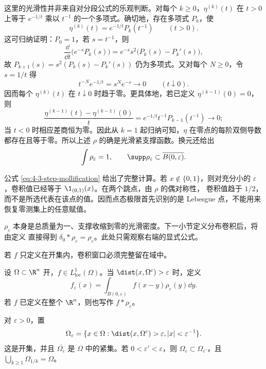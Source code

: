 这里的光滑性并非来自对分段公式的乐观判断。对每个 $k\geq0$，$\eta^{(k)}(t)$ 在 $t>0$
上等于 $e^{-1/t}$ 乘以 $t^{-1}$ 的一个多项式。确切地，存在多项式 $P_k$，使
\[
 \eta^{(k)}(t)=e^{-1/t}P_k(t^{-1})\qquad(t>0).
\]
这可归纳证明：$P_0=1$，若 $s=t^{-1}$，则
\[
 \frac{\dd}{\dd t}\bigl(e^{-s}P_k(s)\bigr)
 =e^{-s}s^2\bigl(P_k(s)-P_k'(s)\bigr),
\]
故 $P_{k+1}(s)=s^2(P_k(s)-P_k'(s))$ 仍为多项式。又对每个 $N\ge0$，令 $s=1/t$ 得
\[
 t^{-N}e^{-1/t}=s^Ne^{-s}\longrightarrow0\qquad(t\downarrow0).
\]
因而每个 $\eta^{(k)}(t)$ 在 $t\downarrow0$ 时趋于零。更具体地，若已定义
$\eta^{(k-1)}(0)=0$，则
\[
 \frac{\eta^{(k-1)}(t)-\eta^{(k-1)}(0)}t
 =e^{-1/t}t^{-1}P_{k-1}(t^{-1})\longrightarrow0;
\]
当 $t<0$ 时相应差商恒为零。因此从 $k=1$ 起归纳可知，$\eta$ 在零点的每阶双侧导数都存在且等于零。所以上述
$\rho$ 的确是光滑紧支撑函数。换元还给出
\[
 \int\rho_\varepsilon=1,\qquad
 \supp\rho_\varepsilon\subset\overline{B(0,\varepsilon)}.
\]

\begin{example}[阶跃函数平滑]\label{ex:4-3-1-1}
公式 \eqref{eq:4-3-step-mollification} 给出了完整计算。若 $x\notin\{0,1\}$，则对充分小的
$\varepsilon$，卷积值已经等于 $\1_{(0,1)}(x)$。在两个跳点，由 $\rho$ 的偶对称性，
卷积值趋于 $1/2$，而不是所选代表在该点的值。因而点态极限首先识别的是 Lebesgue 点，不能用来
恢复零测集上的任意赋值。
\end{example}

\begin{example}\label{ex:4-3-1-2}
$\rho_\varepsilon$ 本身是总质量为一、支撑收缩到零的光滑密度。下一小节定义分布卷积后，将由定义
直接得到 $\delta_0*\rho_\varepsilon=\rho_\varepsilon$。此处只需观察右端的显式公式。
\end{example}

若 $f$ 只定义在开集内，卷积窗口必须完整留在域中。

\begin{definition}[卷积平滑]\label{def:4-3-1-2}
设 $\Omega\subset\R^n$ 开，$f\in L^1_{\mathrm{loc}}(\Omega)$。当
$\dist(x,\Omega^c)>\varepsilon$ 时，定义
\[
 f_\varepsilon(x)
 =\int_{B(0,\varepsilon)}f(x-y)\rho_\varepsilon(y)\dd y.
\]
若 $f$ 已定义在整个 $\R^n$，则也写作 $f*\rho_\varepsilon$。
\end{definition}

\begin{definition}[内部耗尽]\label{def:4-3-1-3}
对 $\varepsilon>0$，置
\[
 \Omega_\varepsilon
 =\{x\in\Omega:\dist(x,\Omega^c)>\varepsilon, |x|<\varepsilon^{-1}\}.
\]
这是开集，并且 $\overline{\Omega_\varepsilon}$ 是 $\Omega$ 中的紧集。若
$0<\varepsilon'<\varepsilon$，则 $\Omega_\varepsilon\subset\Omega_{\varepsilon'}$，且
$\bigcup_{k\geq1}\Omega_{1/k}=\Omega$。
\end{definition}

